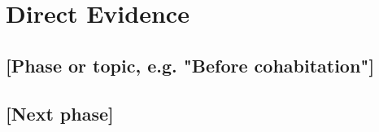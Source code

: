 %
%
\section{Direct Evidence}
\label{sec:direct}
\resetpara

\subsection{[Phase or topic, e.g. "Before cohabitation"]}


\para [Fact.]

\subsection{[Next phase]}

